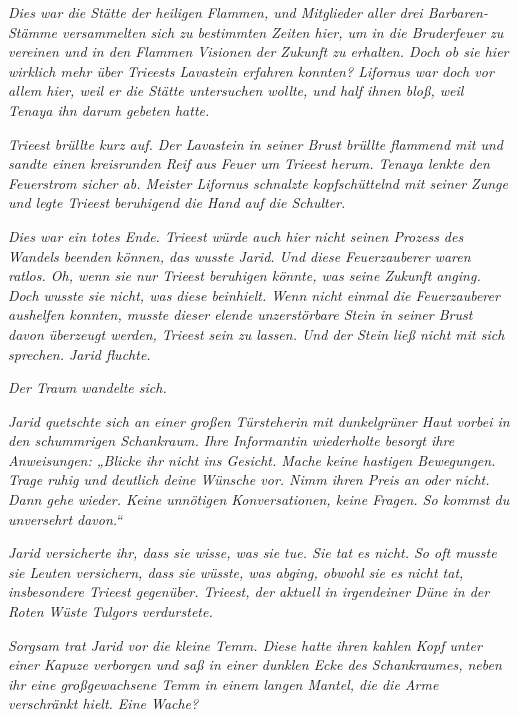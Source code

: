 \textit{Dies war die Stätte der heiligen Flammen, und Mitglieder aller drei Barbaren-Stämme versammelten sich zu bestimmten Zeiten hier, um in die Bruderfeuer zu vereinen und in den Flammen Visionen der Zukunft zu erhalten. Doch ob sie hier wirklich mehr über Trieests Lavastein erfahren konnten? Lifornus war doch vor allem hier, weil er die Stätte untersuchen wollte, und half ihnen bloß, weil Tenaya ihn darum gebeten hatte.}

\textit{Trieest brüllte kurz auf. Der Lavastein in seiner Brust brüllte flammend mit und sandte einen kreisrunden Reif aus Feuer um Trieest herum. Tenaya lenkte den Feuerstrom sicher ab. Meister Lifornus schnalzte kopfschüttelnd mit seiner Zunge und legte Trieest beruhigend die Hand auf die Schulter.}

\textit{Dies war ein totes Ende. Trieest würde auch hier nicht seinen Prozess des Wandels beenden können, das wusste Jarid. Und diese Feuerzauberer waren ratlos. Oh, wenn sie nur Trieest beruhigen könnte, was seine Zukunft anging. Doch wusste sie nicht, was diese beinhielt. Wenn nicht einmal die Feuerzauberer aushelfen konnten, musste dieser elende unzerstörbare Stein in seiner Brust davon überzeugt werden, Trieest sein zu lassen. Und der Stein ließ nicht mit sich sprechen. Jarid fluchte.}



\textit{Der Traum wandelte sich.}





\textit{Jarid quetschte sich an einer großen Türsteherin mit dunkelgrüner Haut vorbei in den schummrigen Schankraum. Ihre Informantin wiederholte besorgt ihre Anweisungen: „Blicke ihr nicht ins Gesicht. Mache keine hastigen Bewegungen. Trage ruhig und deutlich deine Wünsche vor. Nimm ihren Preis an oder nicht. Dann gehe wieder. Keine unnötigen Konversationen, keine Fragen. So kommst du unversehrt davon.“}

\textit{Jarid versicherte ihr, dass sie wisse, was sie tue. Sie tat es nicht. So oft musste sie Leuten versichern, dass sie wüsste, was abging, obwohl sie es nicht tat, insbesondere Trieest gegenüber. Trieest, der aktuell in irgendeiner Düne in der Roten Wüste Tulgors verdurstete.}

\textit{Sorgsam trat Jarid vor die kleine Temm. Diese hatte ihren kahlen Kopf unter einer Kapuze verborgen und saß in einer dunklen Ecke des Schankraumes, neben ihr eine großgewachsene Temm in einem langen Mantel, die die Arme verschränkt hielt. Eine Wache?}

